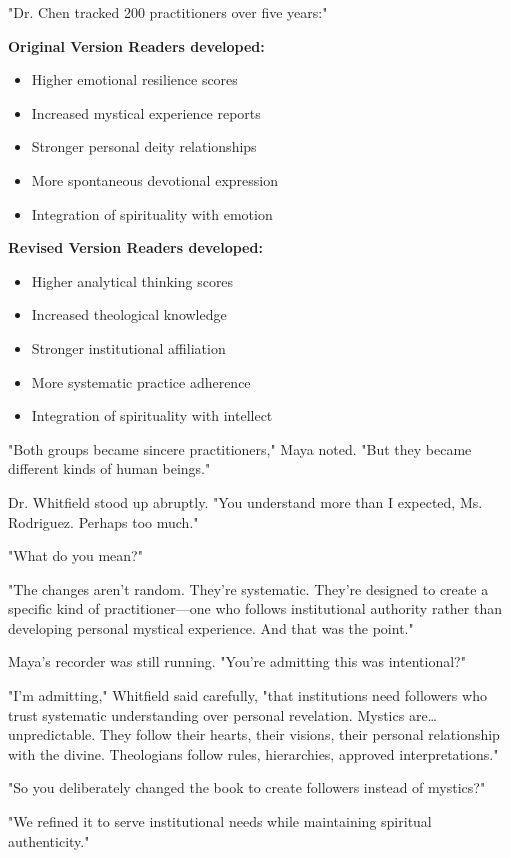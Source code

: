 \documentclass[11pt,twoside]{book}
\begin{document}
\begin{itemize}
"Dr. Chen tracked 200 practitioners over five years:"

\textbf{\textbf{Original Version Readers developed:}}
\begin{itemize}
\item Higher emotional resilience scores
\item Increased mystical experience reports
\item Stronger personal deity relationships
\item More spontaneous devotional expression
\item Integration of spirituality with emotion
\end{itemize}

\textbf{\textbf{Revised Version Readers developed:}}
\begin{itemize}
\item Higher analytical thinking scores
\item Increased theological knowledge
\item Stronger institutional affiliation
\item More systematic practice adherence
\item Integration of spirituality with intellect
\end{itemize}

"Both groups became sincere practitioners," Maya noted. "But they became different kinds of human beings."

Dr. Whitfield stood up abruptly. "You understand more than I expected, Ms. Rodriguez. Perhaps too much."

"What do you mean?"

"The changes aren't random. They're systematic. They're designed to create a specific kind of practitioner—one who follows institutional authority rather than developing personal mystical experience. And that was the point."

Maya's recorder was still running. "You're admitting this was intentional?"

"I'm admitting," Whitfield said carefully, "that institutions need followers who trust systematic understanding over personal revelation. Mystics are\ldots{} unpredictable. They follow their hearts, their visions, their personal relationship with the divine. Theologians follow rules, hierarchies, approved interpretations."

"So you deliberately changed the book to create followers instead of mystics?"

"We refined it to serve institutional needs while maintaining spiritual authenticity."


\end{itemize}
\end{document}
